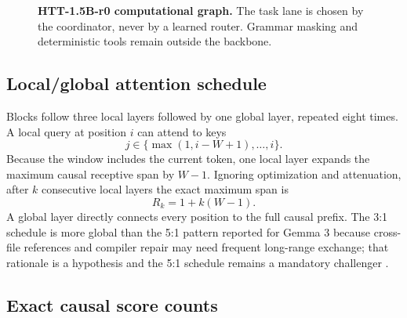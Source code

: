 \documentclass[10pt,letterpaper]{article}
\newcommand{\1}{\mathbb{1}}
\begin{document}
\begin{figure}[t]
  \centering
  \resizebox{\linewidth}{!}{}
  \caption{\textbf{HTT-1.5B-r0 computational graph.}  The task lane is chosen by the coordinator,
  never by a learned router.  Grammar masking and deterministic tools remain outside the backbone.}
  \label{fig:architecture}
\end{figure}

\subsection{Local/global attention schedule}

Blocks follow three local layers followed by one global layer, repeated eight times.  A local query at
position $i$ can attend to keys
\begin{equation}
  j\in\{\max(1,i-W+1),\ldots,i\}.
  \label{eq:local-window}
\end{equation}
Because the window includes the current token, one local layer expands the maximum causal receptive
span by $W-1$.  Ignoring optimization and attenuation, after $k$ consecutive local layers the exact
maximum span is
\begin{equation}
  R_k=1+k(W-1).
  \label{eq:local-receptive-field}
\end{equation}
A global layer directly connects every position to the full causal prefix.  The 3:1 schedule is more
global than the 5:1 pattern reported for Gemma 3 because cross-file references and compiler repair
may need frequent long-range exchange; that rationale is a hypothesis and the 5:1 schedule remains a
mandatory challenger \cite{jiang2023mistral,gemma2025}.

\subsection{Exact causal score counts}
\end{document}
